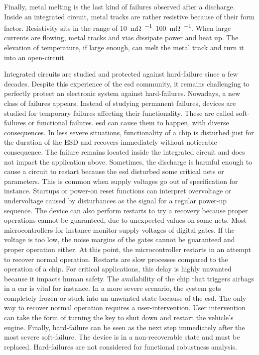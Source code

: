 Finally, metal melting is the last kind of failures observed after a discharge.
Inside an integrated circuit, metal tracks are rather resistive because of their form factor.
Resistivity sits in the range of \SIrange{10}{100}{\milli\ohm\per\sq}.
When large currents are flowing, metal tracks and vias dissipate power and heat up.
The elevation of temperature, if large enough, can melt the metal track and turn it into an open-circuit.

Integrated circuits are studied and protected against hard-failure since a few decades.
Despite this experience of the \gls{esd} community, it remains challenging to perfectly protect an electronic system against hard-failures.
Nowadays, a new class of failures appears.
Instead of studying permanent failures, devices are studied for temporary failures affecting their functionality.
These are called soft-failures or functional failures.
\gls{esd} can cause them to happen, with diverse consequences.
In less severe situations, functionality of a chip is disturbed just for the duration of the ESD and recovers immediately without noticeable consequence.
The failure remains located inside the integrated circuit and does not impact the application above.
Sometimes, the discharge is harmful enough to cause a circuit to restart because the \gls{esd} disturbed some critical nets or parameters.
This is common when supply voltages go out of specification for instance.
Startups or power-on reset functions can interpret overvoltage or undervoltage caused by disturbances as the signal for a regular power-up sequence.
The device can also perform restarts to try a recovery because proper operations cannot be guaranteed, due to unexpected values on some nets.
Most microcontrollers for instance monitor supply voltages of digital gates.
If the voltage is too low, the noise margins of the gates cannot be guaranteed and proper operation either.
At this point, the microcontroller restarts in an attempt to recover normal operation.
Restarts are slow processes compared to the operation of a chip.
For critical applications, this delay is highly unwanted because it impacts human safety.
The availability of the chip that triggers airbags in a car is vital for instance.
In a more severe scenario, the system gets completely frozen or stuck into an unwanted state because of the \gls{esd}.
The only way to recover normal operation requires a user-intervention.
User intervention can take the form of turning the key to shut down and restart the vehicle's engine.
Finally, hard-failure can be seen as the next step immediately after the most severe soft-failure.
The device is in a non-recoverable state and must be replaced.
Hard-failures are not considered for functional robustness analysis.

